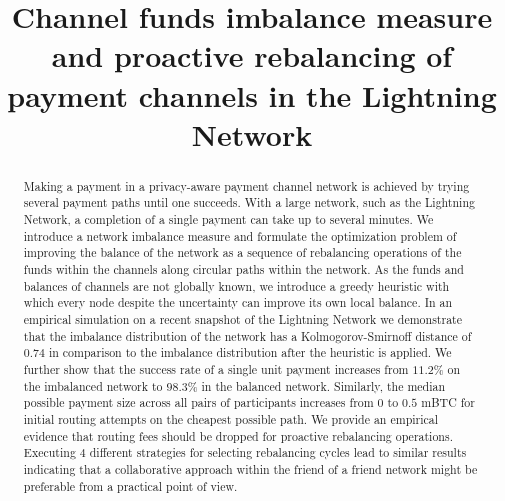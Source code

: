 \documentclass[conference]{IEEEtran}
\begin{document}
 
\title{Channel funds imbalance measure and proactive rebalancing of payment channels in the Lightning Network}
\author{
\and
{}
}

\maketitle 
\begin{abstract}
Making a payment in a privacy-aware payment channel network is achieved by trying several payment paths until one succeeds.
With a large network, such as the Lightning Network, a completion of a single payment can take up to several minutes.
We introduce a network imbalance measure and formulate the optimization problem of improving the balance of the network as a sequence of rebalancing operations of the funds within the channels along circular paths within the network.
As the funds and balances of channels are not globally known, we introduce a greedy heuristic with which every node despite the uncertainty can improve its own local balance.
In an empirical simulation on a recent snapshot of the Lightning Network we demonstrate that the imbalance distribution of the network has a Kolmogorov-Smirnoff distance of $0.74$ in comparison to the imbalance distribution after the heuristic is applied.
We further show that the success rate of a single unit payment increases from $11.2\%$ on the imbalanced network to $98.3\%$ in the balanced network.
 Similarly, the median possible payment size across all pairs of participants increases from $0$ to $0.5$ mBTC for initial routing attempts on the cheapest possible path.
We provide an empirical evidence that routing fees should be dropped for proactive rebalancing operations.
Executing $4$ different strategies for selecting rebalancing cycles lead to similar results 
indicating that a collaborative approach within the friend of a friend network might be preferable from a practical point of view.
\end{abstract}
\end{document}
